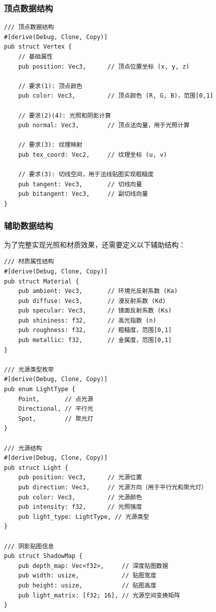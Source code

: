 \documentclass[12pt,a4paper]{article}
\begin{document}
\subsubsection{顶点数据结构}

\begin{lstlisting}[style=ruststyle, caption={完整顶点数据结构}]
/// 顶点数据结构
#[derive(Debug, Clone, Copy)]
pub struct Vertex {
    // 基础属性
    pub position: Vec3,      // 顶点位置坐标 (x, y, z)
    
    // 要求(1): 顶点颜色
    pub color: Vec3,         // 顶点颜色 (R, G, B)，范围[0,1]
    
    // 要求(2)(4): 光照和阴影计算
    pub normal: Vec3,        // 顶点法向量，用于光照计算
    
    // 要求(3): 纹理映射
    pub tex_coord: Vec2,     // 纹理坐标 (u, v)
    
    // 要求(3): 切线空间，用于法线贴图实现粗糙度
    pub tangent: Vec3,       // 切线向量
    pub bitangent: Vec3,     // 副切线向量
}
\end{lstlisting}

\subsubsection{辅助数据结构}

为了完整实现光照和材质效果，还需要定义以下辅助结构：

\begin{lstlisting}[style=ruststyle, caption={材质和光源结构}]
/// 材质属性结构
#[derive(Debug, Clone, Copy)]
pub struct Material {
    pub ambient: Vec3,       // 环境光反射系数 (Ka)
    pub diffuse: Vec3,       // 漫反射系数 (Kd)
    pub specular: Vec3,      // 镜面反射系数 (Ks)
    pub shininess: f32,      // 高光指数 (n)
    pub roughness: f32,      // 粗糙度，范围[0,1]
    pub metallic: f32,       // 金属度，范围[0,1]
}

/// 光源类型枚举
#[derive(Debug, Clone, Copy)]
pub enum LightType {
    Point,       // 点光源
    Directional, // 平行光
    Spot,        // 聚光灯
}

/// 光源结构
#[derive(Debug, Clone, Copy)]
pub struct Light {
    pub position: Vec3,      // 光源位置
    pub direction: Vec3,     // 光源方向（用于平行光和聚光灯）
    pub color: Vec3,         // 光源颜色
    pub intensity: f32,      // 光照强度
    pub light_type: LightType, // 光源类型
}

/// 阴影贴图信息
pub struct ShadowMap {
    pub depth_map: Vec<f32>,     // 深度贴图数据
    pub width: usize,            // 贴图宽度
    pub height: usize,           // 贴图高度
    pub light_matrix: [f32; 16], // 光源空间变换矩阵
}
\end{lstlisting}
\end{document}
